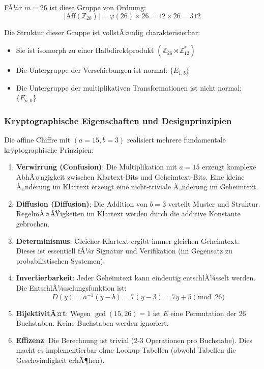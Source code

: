 ﻿\documentclass[12pt,a4paper]{article}
\begin{document}
	FÃ¼r $m = 26$ ist diese Gruppe von Ordnung:
	\begin{equation}
		|\mathrm{Aff}(\mathbb{Z}_{26})| = \varphi(26) \times 26 = 12 \times 26 = 312
	\end{equation}
	
	Die Struktur dieser Gruppe ist vollstÃ¤ndig charakterisierbar:
	\begin{itemize}
		\item Sie ist isomorph zu einer Halbdirektprodukt $(\mathbb{Z}_{26} \rtimes \mathbb{Z}_{12}^*)$
		\item Die Untergruppe der Verschiebungen ist normal: $\{E_{1, b}\}$
		\item Die Untergruppe der multiplikativen Transformationen ist nicht normal: $\{E_{a, 0}\}$
	\end{itemize}
	
	\subsubsection{Kryptographische Eigenschaften und Designprinzipien}
	
	Die affine Chiffre mit $(a=15, b=3)$ realisiert mehrere fundamentale kryptographische Prinzipien:
	
	\begin{enumerate}
		\item \textbf{Verwirrung (Confusion)}: Die Multiplikation mit $a = 15$ erzeugt komplexe AbhÃ¤ngigkeit zwischen Klartext-Bits und Geheimtext-Bits. Eine kleine Ã„nderung im Klartext erzeugt eine nicht-triviale Ã„nderung im Geheimtext.
		
		\item \textbf{Diffusion (Diffusion)}: Die Addition von $b = 3$ verteilt Muster und Struktur. RegelmÃ¤ÃŸigkeiten im Klartext werden durch die additive Konstante gebrochen.
		
		\item \textbf{Determinismus}: Gleicher Klartext ergibt immer gleichen Geheimtext. Dieses ist essentiell fÃ¼r Signatur und Verifikation (im Gegensatz zu probabilistischen Systemen).
		
		\item \textbf{Invertierbarkeit}: Jeder Geheimtext kann eindeutig entschlÃ¼sselt werden. Die EntschlÃ¼sselungsfunktion ist:
		\begin{equation}
			D(y) = a^{-1}(y - b) = 7(y - 3) = 7y + 5 \pmod{26}
		\end{equation}
		
		\item \textbf{BijektivitÃ¤t}: Wegen $\gcd(15, 26) = 1$ ist $E$ eine Permutation der 26 Buchstaben. Keine Buchstaben werden ignoriert.
		
		\item \textbf{Effizenz}: Die Berechnung ist trivial (2-3 Operationen pro Buchstabe). Dies macht es implementierbar ohne Lookup-Tabellen (obwohl Tabellen die Geschwindigkeit erhÃ¶hen).
	\end{enumerate}
	
\end{document}
